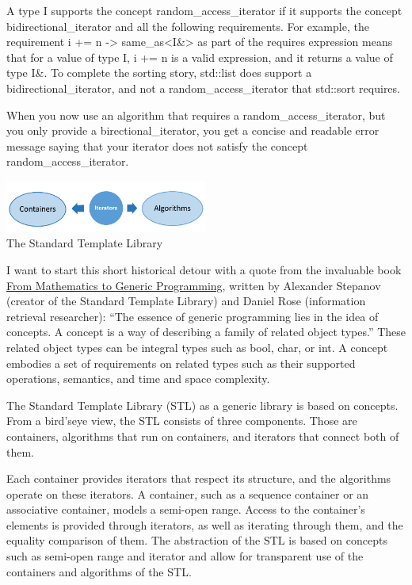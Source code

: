 A type I supports the concept random\_access\_iterator if it supports the concept bidirectional\_iterator and all the following requirements. For example, the requirement { i += n } -> same\_as<I\&> as part of the requires expression means that for a value of type I, { i += n } is a valid expression, and it returns a value of type I\&. To complete the sorting story, std::list does support a bidirectional\_iterator, and not a random\_access\_iterator that std::sort requires.

When you now use an algorithm that requires a random\_access\_iterator, but you only provide a birectional\_iterator, you get a concise and readable error message saying that your iterator does not satisfy the concept random\_access\_iterator.

\begin{center}
\includegraphics[width=0.5\textwidth]{content/3/chapter4/images/6.png}\\
The Standard Template Library
\end{center}

\begin{tcolorbox}[colback=blue!5!white,colframe=blue!75!black,title={泛型编程的本质}]
I want to start this short historical detour with a quote from the invaluable book \href{https://www.fm2gp.com/}{From Mathematics to Generic Programming}, written by Alexander Stepanov (creator of the Standard Template Library) and Daniel Rose (information retrieval researcher): “The essence of generic programming lies in the idea of concepts. A concept is a way of describing a family of related object types.” These related object types can be integral types such as bool, char, or int. A concept embodies a set of requirements on related types such as their supported operations, semantics, and time and space complexity.

The Standard Template Library (STL) as a generic library is based on concepts. From a bird’seye view, the STL consists of three components. Those are containers, algorithms that run on containers, and iterators that connect both of them.

Each container provides iterators that respect its structure, and the algorithms operate on these iterators. A container, such as a sequence container or an associative container, models a semi-open range. Access to the container’s elements is provided through iterators, as well as iterating through them, and the equality comparison of them. The abstraction of the STL is based on concepts such as semi-open range and iterator and allow for transparent use of the containers and algorithms of the STL.
\end{tcolorbox}

